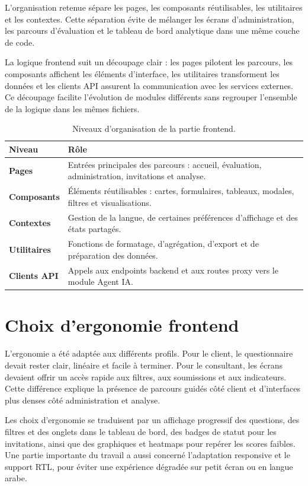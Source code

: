 \documentclass[12pt,a4paper]{report}
\begin{document}
L'organisation retenue sépare les pages, les composants réutilisables, les utilitaires et les contextes. Cette séparation évite de mélanger les écrans d'administration, les parcours d'évaluation et le tableau de bord analytique dans une même couche de code.

La logique frontend suit un découpage clair : les pages pilotent les parcours, les composants affichent les éléments d'interface, les utilitaires transforment les données et les clients API assurent la communication avec les services externes. Ce découpage facilite l'évolution de modules différents sans regrouper l'ensemble de la logique dans les mêmes fichiers.

\begin{table}[H]
\centering
\caption{Niveaux d'organisation de la partie frontend.}
\begin{tabularx}{\textwidth}{>{\bfseries}L{3.5cm}Y}
\toprule
Niveau & Rôle \\
\midrule
Pages & Entrées principales des parcours : accueil, évaluation, administration, invitations et analyse. \\
Composants & Éléments réutilisables : cartes, formulaires, tableaux, modales, filtres et visualisations. \\
Contextes & Gestion de la langue, de certaines préférences d'affichage et des états partagés. \\
Utilitaires & Fonctions de formatage, d'agrégation, d'export et de préparation des données. \\
Clients API & Appels aux endpoints backend et aux routes proxy vers le module Agent IA. \\
\bottomrule
\end{tabularx}
\end{table}

\section{Choix d'ergonomie frontend}
L'ergonomie a été adaptée aux différents profils. Pour le client, le questionnaire devait rester clair, linéaire et facile à terminer. Pour le consultant, les écrans devaient offrir un accès rapide aux filtres, aux soumissions et aux indicateurs. Cette différence explique la présence de parcours guidés côté client et d'interfaces plus denses côté administration et analyse.

Les choix d'ergonomie se traduisent par un affichage progressif des questions, des filtres et des onglets dans le tableau de bord, des badges de statut pour les invitations, ainsi que des graphiques et heatmaps pour repérer les scores faibles. Une partie importante du travail a aussi concerné l'adaptation responsive et le support RTL, pour éviter une expérience dégradée sur petit écran ou en langue arabe.
\end{document}
